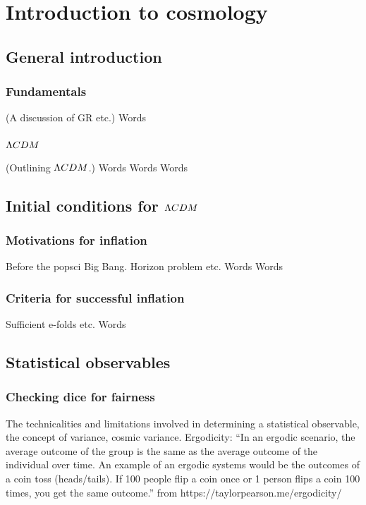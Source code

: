 %
\chapter{Introduction to cosmology}\label{chapter:intro_general}
\section{General introduction}\label{sec:general_intro}
    \subsection{Fundamentals}
    (A discussion of GR etc.)
\newpage
    Words
\newpage
    \subsection{$\Lambda CDM$}
    (Outlining $\Lambda CDM$.)
\newpage
    Words
\newpage
    Words
\newpage
    Words
\newpage
\section{Initial conditions for $\Lambda CDM$}
    \subsection{Motivations for inflation}
    Before the popsci Big Bang. Horizon problem etc.
\newpage
    Words
\newpage
    Words
\newpage
    \subsection{Criteria for successful inflation}
    Sufficient e-folds etc.
\newpage
    Words
\newpage
\section{Statistical observables}
    \subsection{Checking dice for fairness}
    The technicalities and limitations involved in determining a statistical observable,
    the concept of variance, cosmic variance.
    Ergodicity: ``In an ergodic scenario, the average outcome of the group is the same as the average outcome of the individual over time. An example of an ergodic systems would be the outcomes of a coin toss (heads/tails). If 100 people flip a coin once or 1 person flips a coin 100 times, you get the same outcome.'' from https://taylorpearson.me/ergodicity/


